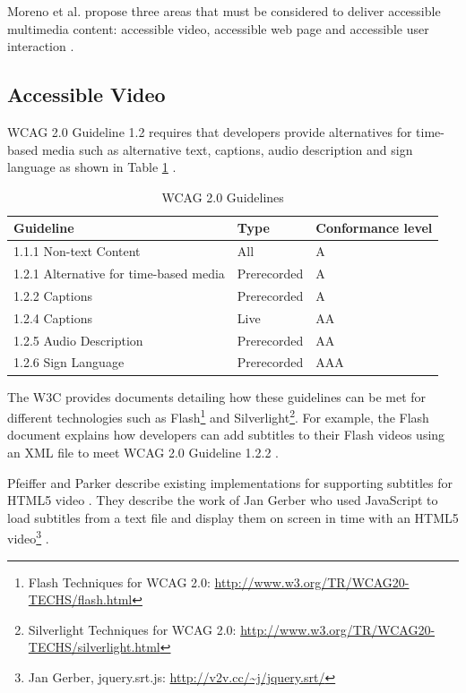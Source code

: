 \documentclass[journal]{IEEEtran}
\begin{document}
Moreno et al. propose three areas that must be considered to deliver accessible multimedia content: accessible video, accessible web page and accessible user interaction \cite{article:disablityStandardsForMultimediaOnTheWeb}.

\subsection{Accessible Video}
WCAG 2.0 Guideline 1.2 requires that developers provide alternatives for time-based media such as alternative text, captions, audio description and sign language as shown in Table \ref{tab:wcag2Guidelines} \cite{standard:wcag2}.

\begin{table}
  \caption{WCAG 2.0 Guidelines \cite{standard:wcag2}}
  \label{tab:wcag2Guidelines}
  	\centering
    \begin{tabular}{|l|l|p{1.5cm}|}
    \hline
    \textbf{Guideline}          & \textbf{Type} & \textbf{Conformance level} \\ \hline
    1.1.1 Non-text Content                 & All         & A                 \\ \hline
    1.2.1 Alternative for time-based media & Prerecorded & A                 \\ \hline
    1.2.2 Captions                         & Prerecorded & A                 \\ \hline
    1.2.4 Captions                         & Live        & AA                \\ \hline
    1.2.5 Audio Description                & Prerecorded & AA                \\ \hline
    1.2.6 Sign Language                    & Prerecorded & AAA               \\ \hline
    \end{tabular}
\end{table}

The W3C provides documents detailing how these guidelines can be met for different technologies such as Flash\footnote{Flash Techniques for WCAG 2.0: \url{http://www.w3.org/TR/WCAG20-TECHS/flash.html}} and Silverlight\footnote{Silverlight Techniques for WCAG 2.0: \url{http://www.w3.org/TR/WCAG20-TECHS/silverlight.html}}. For example, the Flash document explains how developers can add subtitles to their Flash videos using an XML file to meet WCAG 2.0 Guideline 1.2.2 \cite{website:flashTechniquesForWCAG}.

Pfeiffer and Parker describe existing implementations for supporting subtitles for HTML5 video \cite{inproceedings:accessibilityForTheHTML5VideoElement}. They describe the work of Jan Gerber who used JavaScript to load subtitles from a text file and display them on screen in time with an HTML5 video\footnote{Jan Gerber, jquery.srt.js: \url{http://v2v.cc/~j/jquery.srt/}} \cite{inproceedings:accessibilityForTheHTML5VideoElement}.
\end{document}
